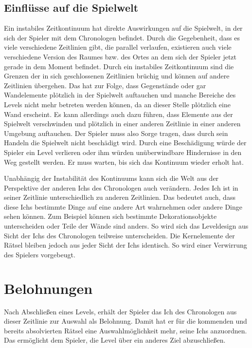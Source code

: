 \subsection{Einflüsse auf die Spielwelt}\label{sec:paradoxon-stability}
Ein instabiles Zeitkontinuum hat direkte Auswirkungen auf die Spielwelt, in der sich der Spieler mit dem Chronologen befindet. Durch die Gegebenheit, dass es viele verschiedene Zeitlinien gibt, die parallel verlaufen, existieren auch viele verschiedene Version des Raumes bzw. des Ortes an dem sich der Spieler jetzt gerade in dem Moment befindet. Durch ein instabiles Zeitkontinuum sind die Grenzen der in sich geschlossenen Zeitlinien brüchig und können auf andere Zeitlinien übergehen. Das hat zur Folge, dass Gegenstände oder gar Wandelemente plötzlich in der Spielwelt auftauchen und manche Bereiche des Levels nicht mehr betreten werden können, da an dieser Stelle plötzlich eine Wand erscheint. Es kann allerdings auch dazu führen, dass Elemente aus der Spielwelt verschwinden und plötzlich in einer anderen Zeitlinie in einer anderen Umgebung auftauchen. Der Spieler muss also Sorge tragen, dass durch sein Handeln die Spielwelt nicht beschädigt wird. Durch eine Beschädigung würde der Spieler ein Level verlieren oder ihm würden unüberwindbare Hindernisse in den Weg gestellt werden. Er muss warten, bis sich das Kontinuum wieder erholt hat.

Unabhängig der Instabilität des Kontinuums kann sich die Welt aus der Perspektive der anderen Ichs des Chronologen auch verändern. Jedes Ich ist in seiner Zeitlinie unterschiedlich zu anderen Zeitlinien. Das bedeutet auch, dass diese Ichs bestimmte Dinge auf eine andere Art wahrnehmen oder andere Dinge sehen können. Zum Beispiel können sich bestimmte Dekorationsobjekte unterscheiden oder Teile der Wände sind anders. So wird sich das Leveldesign aus Sicht der Ichs des Chronologen teilweise unterscheiden. Die Kernelemente der Rätsel bleiben jedoch aus jeder Sicht der Ichs identisch. So wird einer Verwirrung des Spielers vorgebeugt.

\section{Belohnungen}
Nach Abschließen eines Levels, erhält der Spieler das Ich des Chronologen aus dieser Zeitlinie zur Auswahl als Belohnung. Damit hat er für die kommenden und bereits absolvierten Rätsel eine Auswahlmöglichkeit mehr, seine Ichs anzuordnen. Das ermöglicht dem Spieler, die Level über ein anderes Ziel abzuschließen.

